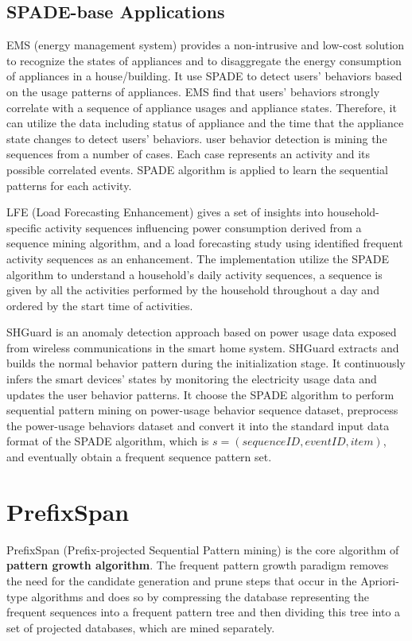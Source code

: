 \documentclass[sigplan, screen]{acmart}
\begin{document}
\subsection{SPADE-base Applications}
EMS (energy management system)\cite{chen2013detecting} provides a non-intrusive and low-cost 
solution to recognize the states of appliances and to disaggregate 
the energy consumption of appliances in a house/building. It use SPADE to detect users' behaviors based on the usage patterns of 
appliances. EMS find that users' behaviors strongly correlate with a 
sequence of appliance usages and appliance states. Therefore, 
it can utilize the data including status of appliance and the 
time that the appliance state changes to detect users' behaviors. user behavior detection is mining 
the sequences from a number of cases. Each case represents an 
activity and its possible correlated events. SPADE algorithm is applied to learn the sequential patterns for each 
activity.

LFE (Load Forecasting Enhancement)\cite{ding2015sequential} gives a set of insights
into household-specific activity sequences influencing power consumption derived from a sequence mining algorithm,
and a load forecasting
study using identified frequent activity sequences as an enhancement.
The implementation utilize the SPADE algorithm to understand a household’s daily activity sequences, a
sequence is given by all the activities performed by the
household throughout a day and ordered by the start time of
activities.

SHGuard\cite{mao2019anomalous} is an anomaly detection approach
based on power usage data exposed from wireless communications in the smart home system.
SHGuard extracts and
builds the normal behavior pattern during the initialization stage. It continuously infers the smart devices’ states
by monitoring the electricity usage data and updates the
user behavior patterns. 
It choose the SPADE algorithm to perform sequential
pattern mining on power-usage behavior sequence dataset, preprocess the
power-usage behaviors dataset and convert it into the standard input data format of the SPADE algorithm, which is
$s = (sequenceID, eventID,item)$, and eventually obtain a frequent sequence pattern set.

\section{PrefixSpan}
PrefixSpan (Prefix-projected Sequential Pattern mining)\cite{han2001prefixspan} is the core algorithm of \textbf{pattern growth algorithm}. The frequent pattern growth paradigm removes the need for the 
candidate generation and prune steps that occur in the Apriori-type algorithms and does so by compressing the database representing the 
frequent sequences into a frequent pattern tree and
then dividing this tree into a set of projected databases, which are mined separately\cite{han2000mining}.
\end{document}
